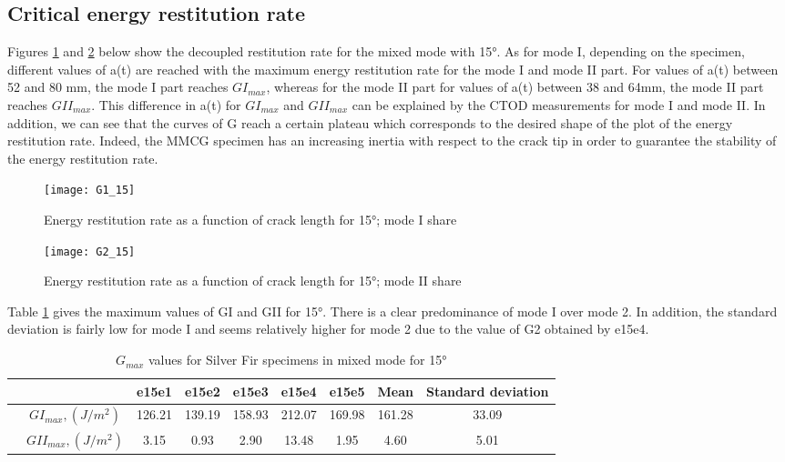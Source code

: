 \subsection{Critical energy restitution rate}

Figures \ref{fig:G1_15} and \ref{fig:G2_15} below show the decoupled restitution rate for the mixed mode with 15°.
As for mode I, depending on the specimen, different values of a(t) are reached with the maximum energy restitution rate for the mode I and mode II part. For values of a(t) between 52 and 80 mm, the mode I part reaches $GI_{max}$, whereas for the mode II part for values of a(t) between 38 and 64mm, the mode II part reaches $GII_{max}$. This difference in a(t) for $GI_{max}$ and $GII_{max}$ can be explained by the CTOD measurements for mode I and mode II.
In addition, we can see that the curves of G reach a certain plateau which corresponds to the desired shape of the plot of the energy restitution rate. Indeed, the MMCG specimen has an increasing inertia with respect to the crack tip in order to guarantee the stability of the energy restitution rate.

\begin{figure}[htp]
	\centering
	\texttt{[image: G1\_15]}
	\caption{Energy restitution rate as a function of crack length for 15°; mode I share}
	\label{fig:G1_15}
\end{figure}

\begin{figure}[htp]
	\centering
	\texttt{[image: G2\_15]}
	\caption{Energy restitution rate as a function of crack length for 15°; mode II share}
	\label{fig:G2_15}
\end{figure}

Table \ref{fig:tableG15} gives the maximum values of GI and GII for 15°. There is a clear predominance of mode I over mode 2. In addition, the standard deviation is fairly low for mode I and seems relatively higher for mode 2 due to the value of G2 obtained by e15e4.

\begin{table} [H]
	\centering
	\begin{tabular}{ccccccccc}
		\toprule %
		&  & e15e1 & e15e2 & e15e3 & e15e4 & e15e5 & Mean & Standard deviation\\\midrule
		& $GI_{max}, (J/m^2)$ & 126.21 & 139.19 & 158.93 & 212.07 & 169.98 & 161.28 & 33.09 \\\midrule
		& $GII_{max}, (J/m^2)$ & 3.15 & 0.93 & 2.90 & 13.48 & 1.95 & 4.60 & 5.01\\\midrule
	\end{tabular}
	\caption{$G_{max}$ values for Silver Fir specimens in mixed mode for 15°}
	\label{fig:tableG15}
\end{table}


